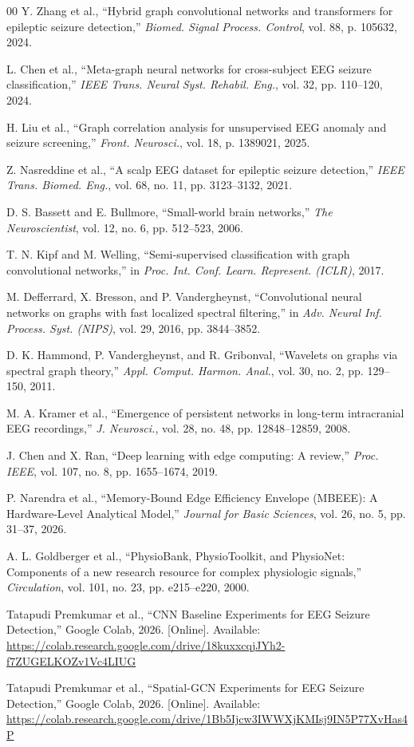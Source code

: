 \documentclass[journal]{IEEEtran}
\begin{document}
\begin{thebibliography}{00}
 Y. Zhang et al., ``Hybrid graph convolutional networks and transformers for epileptic seizure detection,'' \textit{Biomed. Signal Process. Control}, vol. 88, p. 105632, 2024.

 L. Chen et al., ``Meta-graph neural networks for cross-subject EEG seizure classification,'' \textit{IEEE Trans. Neural Syst. Rehabil. Eng.}, vol. 32, pp. 110--120, 2024.

 H. Liu et al., ``Graph correlation analysis for unsupervised EEG anomaly and seizure screening,'' \textit{Front. Neurosci.}, vol. 18, p. 1389021, 2025.

 Z. Nasreddine et al., ``A scalp EEG dataset for epileptic seizure detection,'' \textit{IEEE Trans. Biomed. Eng.}, vol. 68, no. 11, pp. 3123--3132, 2021.

 D. S. Bassett and E. Bullmore, ``Small-world brain networks,'' \textit{The Neuroscientist}, vol. 12, no. 6, pp. 512--523, 2006.

 T. N. Kipf and M. Welling, ``Semi-supervised classification with graph convolutional networks,'' in \textit{Proc. Int. Conf. Learn. Represent. (ICLR)}, 2017.

 M. Defferrard, X. Bresson, and P. Vandergheynst, ``Convolutional neural networks on graphs with fast localized spectral filtering,'' in \textit{Adv. Neural Inf. Process. Syst. (NIPS)}, vol. 29, 2016, pp. 3844--3852.

 D. K. Hammond, P. Vandergheynst, and R. Gribonval, ``Wavelets on graphs via spectral graph theory,'' \textit{Appl. Comput. Harmon. Anal.}, vol. 30, no. 2, pp. 129--150, 2011.

 M. A. Kramer et al., ``Emergence of persistent networks in long-term intracranial EEG recordings,'' \textit{J. Neurosci.}, vol. 28, no. 48, pp. 12848--12859, 2008.

 J. Chen and X. Ran, ``Deep learning with edge computing: A review,'' \textit{Proc. IEEE}, vol. 107, no. 8, pp. 1655--1674, 2019.

 P. Narendra et al., ``Memory-Bound Edge Efficiency Envelope (MBEEE): A Hardware-Level Analytical Model,'' \textit{Journal for Basic Sciences}, vol. 26, no. 5, pp. 31--37, 2026.

 A. L. Goldberger et al., ``PhysioBank, PhysioToolkit, and PhysioNet: Components of a new research resource for complex physiologic signals,'' \textit{Circulation}, vol. 101, no. 23, pp. e215--e220, 2000.

 Tatapudi Premkumar et al., ``CNN Baseline Experiments for EEG Seizure Detection,'' Google Colab, 2026. [Online]. Available: \url{https://colab.research.google.com/drive/18kuxxcqjJYh2-f7ZUGELKOZv1Vc4LIUG}

 Tatapudi Premkumar et al., ``Spatial-GCN Experiments for EEG Seizure Detection,'' Google Colab, 2026. [Online]. Available: \url{https://colab.research.google.com/drive/1Bb5Ijcw3IWWXjKMIsj9IN5P77XvHas4P}

\end{thebibliography}
\end{document}
